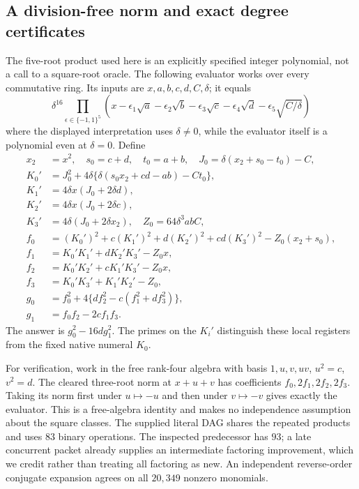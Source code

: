 \subsection{A division-free norm and exact degree certificates}
The five-root product used here is an explicitly specified integer polynomial,
not a call to a square-root oracle. The following evaluator works over every
commutative ring. Its inputs are $x,a,b,c,d,C,\delta$; it equals
\[
 \delta^{16}\prod_{\epsilon\in\{-1,1\}^5}
 \left(x-\epsilon_1\sqrt a-\epsilon_2\sqrt b-
 \epsilon_3\sqrt c-\epsilon_4\sqrt d-\epsilon_5\sqrt{C/\delta}\right)
\]
where the displayed interpretation uses $\delta\ne0$, while the evaluator
itself is a polynomial even at $\delta=0$. Define
\begin{align*}
 x_2&=x^2,\quad s_0=c+d,\quad t_0=a+b,\quad J_0=\delta(x_2+s_0-t_0)-C,\\
 K_0'&=J_0^2+4\delta\{\delta(s_0x_2+cd-ab)-Ct_0\},\\
 K_1'&=4\delta x(J_0+2\delta d),\\
 K_2'&=4\delta x(J_0+2\delta c),\\
 K_3'&=4\delta(J_0+2\delta x_2),\quad Z_0=64\delta^3abC,\\
 f_0&=(K_0')^2+c(K_1')^2+d(K_2')^2+cd(K_3')^2-Z_0(x_2+s_0),\\
 f_1&=K_0'K_1'+dK_2'K_3'-Z_0x,\\
 f_2&=K_0'K_2'+cK_1'K_3'-Z_0x,\\
 f_3&=K_0'K_3'+K_1'K_2'-Z_0,\\
 g_0&=f_0^2+4\{df_2^2-c(f_1^2+df_3^2)\},\\
 g_1&=f_0f_2-2cf_1f_3.
\end{align*}
The answer is $g_0^2-16dg_1^2$. The primes on the $K_i'$ distinguish
these local registers from the fixed native numeral $K_0$.

For verification, work in the free rank-four algebra with basis
$1,u,v,uv$, $u^2=c$, $v^2=d$. The cleared three-root norm at $x+u+v$
has coefficients $f_0,2f_1,2f_2,2f_3$. Taking its norm first under
$u\mapsto-u$ and then under $v\mapsto-v$ gives exactly the evaluator.
This is a free-algebra identity and makes no independence assumption about
the square classes. The supplied literal DAG shares the repeated products
and uses $83$ binary operations. The inspected predecessor has $93$;
a late concurrent packet already supplies an intermediate factoring
improvement, which we credit rather than treating all factoring as new.
An independent reverse-order conjugate expansion agrees on all $20{,}349$
nonzero monomials.

